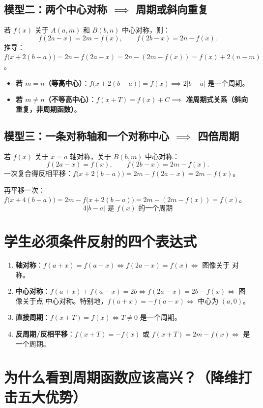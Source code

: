 \documentclass[11pt,a4paper]{ctexart}
\begin{document}
\subsection{模型二：两个中心对称 $\implies$ 周期或斜向重复}
若 $f(x)$ 关于 $A(a,m)$ 和 $B(b,n)$ 中心对称，则：
\[
f(2a-x) = 2m - f(x), \qquad f(2b-x) = 2n - f(x).
\]
推导：$f\bigl(x+2(b-a)\bigr) = 2n - f(2a-x) = 2n - (2m - f(x)) = f(x) + 2(n-m)$。
\begin{itemize}[itemsep=0.3em]
  \item \textbf{若 $m=n$（等高中心）}：$f\bigl(x+2(b-a)\bigr) = f(x) \implies \boxed{2|b-a| \text{ 是一个周期}}$。
  \item \textbf{若 $m \neq n$（不等高中心）}：$f(x+T) = f(x) + C \implies$ \textbf{准周期式关系（斜向重复，非周期函数）}。
\end{itemize}

\subsection{模型三：一条对称轴和一个对称中心 $\implies$ 四倍周期}
若 $f(x)$ 关于 $x=a$ 轴对称，关于 $B(b,m)$ 中心对称：
\[
f(2a-x) = f(x), \qquad f(2b-x) = 2m - f(x).
\]
一次复合得反相平移：$f\bigl(x+2(b-a)\bigr) = 2m - f(2a-x) = 2m - f(x)$。\par
再平移一次：$f\bigl(x+4(b-a)\bigr) = 2m - f\bigl(x+2(b-a)\bigr) = 2m - (2m - f(x)) = f(x)$。
\[
\boxed{4|b-a| \text{ 是 } f(x) \text{ 的一个周期}}
\]

\section{学生必须条件反射的四个表达式}

\begin{enumerate}[label=\arabic*. , leftmargin=2em, itemsep=0.4em]
  \item \textbf{轴对称}：$f(a+x) = f(a-x) \iff f(2a-x) = f(x) \iff$ 图像关于 \blank{2cm} 对称。
  \item \textbf{中心对称}：$f(a+x) + f(a-x) = 2b \iff f(2a-x) = 2b - f(x) \iff$ 图像关于点 \blank{2cm} 中心对称。特别地，$f(a+x) = -f(a-x) \iff$ 中心为 $(a,0)$。
  \item \textbf{直接周期}：$f(x+T) = f(x) \iff T \neq 0$ 是一个周期。
  \item \textbf{反周期/反相平移}：$f(x+T) = -f(x)$ 或 $f(x+T) = 2m - f(x) \iff$ \blank{2cm} 是一个周期。
\end{enumerate}

\section{为什么看到周期函数应该高兴？（降维打击五大优势）}
\end{document}

